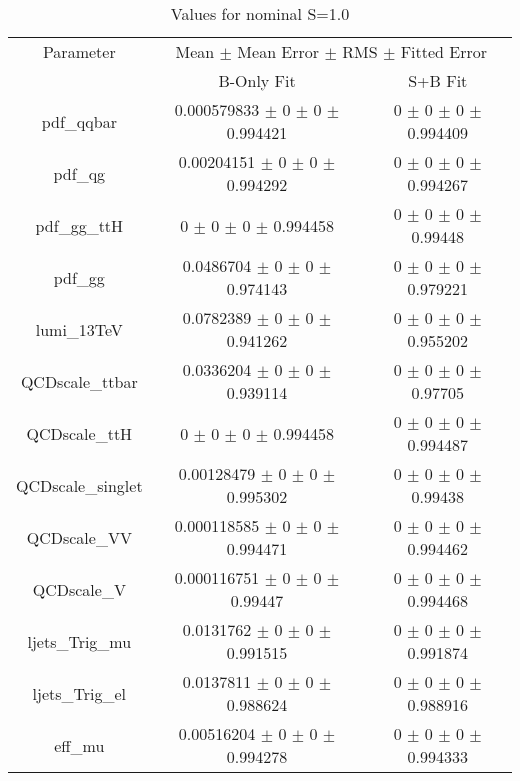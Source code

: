 \begin{table}
\centering
\caption{Values for nominal S=1.0}
\begin{tabular}{ccc}
\toprule
Parameter 	& \multicolumn{2}{c}{Mean $\pm$ Mean Error $\pm$ RMS $\pm$ Fitted Error}\\
 	& B-Only Fit & S+B Fit\\
\midrule
pdf\_qqbar 	& \num{0.000579833} $\pm$ \num{0} $\pm$ \num{0} $\pm$ \num{0.994421} 	& \num{0} $\pm$ \num{0} $\pm$ \num{0} $\pm$ \num{0.994409}\\
pdf\_qg 	& \num{0.00204151} $\pm$ \num{0} $\pm$ \num{0} $\pm$ \num{0.994292} 	& \num{0} $\pm$ \num{0} $\pm$ \num{0} $\pm$ \num{0.994267}\\
pdf\_gg\_ttH 	& \num{0} $\pm$ \num{0} $\pm$ \num{0} $\pm$ \num{0.994458} 	& \num{0} $\pm$ \num{0} $\pm$ \num{0} $\pm$ \num{0.99448}\\
pdf\_gg 	& \num{0.0486704} $\pm$ \num{0} $\pm$ \num{0} $\pm$ \num{0.974143} 	& \num{0} $\pm$ \num{0} $\pm$ \num{0} $\pm$ \num{0.979221}\\
lumi\_13TeV 	& \num{0.0782389} $\pm$ \num{0} $\pm$ \num{0} $\pm$ \num{0.941262} 	& \num{0} $\pm$ \num{0} $\pm$ \num{0} $\pm$ \num{0.955202}\\
QCDscale\_ttbar 	& \num{0.0336204} $\pm$ \num{0} $\pm$ \num{0} $\pm$ \num{0.939114} 	& \num{0} $\pm$ \num{0} $\pm$ \num{0} $\pm$ \num{0.97705}\\
QCDscale\_ttH 	& \num{0} $\pm$ \num{0} $\pm$ \num{0} $\pm$ \num{0.994458} 	& \num{0} $\pm$ \num{0} $\pm$ \num{0} $\pm$ \num{0.994487}\\
QCDscale\_singlet 	& \num{0.00128479} $\pm$ \num{0} $\pm$ \num{0} $\pm$ \num{0.995302} 	& \num{0} $\pm$ \num{0} $\pm$ \num{0} $\pm$ \num{0.99438}\\
QCDscale\_VV 	& \num{0.000118585} $\pm$ \num{0} $\pm$ \num{0} $\pm$ \num{0.994471} 	& \num{0} $\pm$ \num{0} $\pm$ \num{0} $\pm$ \num{0.994462}\\
QCDscale\_V 	& \num{0.000116751} $\pm$ \num{0} $\pm$ \num{0} $\pm$ \num{0.99447} 	& \num{0} $\pm$ \num{0} $\pm$ \num{0} $\pm$ \num{0.994468}\\
ljets\_Trig\_mu 	& \num{0.0131762} $\pm$ \num{0} $\pm$ \num{0} $\pm$ \num{0.991515} 	& \num{0} $\pm$ \num{0} $\pm$ \num{0} $\pm$ \num{0.991874}\\
ljets\_Trig\_el 	& \num{0.0137811} $\pm$ \num{0} $\pm$ \num{0} $\pm$ \num{0.988624} 	& \num{0} $\pm$ \num{0} $\pm$ \num{0} $\pm$ \num{0.988916}\\
eff\_mu 	& \num{0.00516204} $\pm$ \num{0} $\pm$ \num{0} $\pm$ \num{0.994278} 	& \num{0} $\pm$ \num{0} $\pm$ \num{0} $\pm$ \num{0.994333}\\

\end{tabular}
\end{table}
